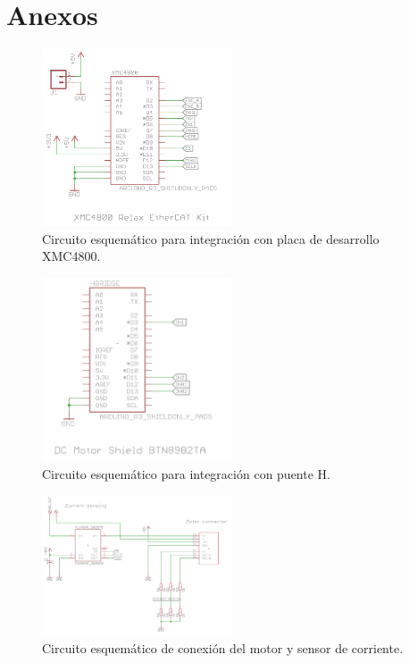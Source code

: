 \chapter{Anexos}

\begin{figure}[ht]
  \centering
  \includegraphics[width=0.5\textwidth]{img/anexo/xmc4800_schematic}
  \caption{Circuito esquemático para integración con placa de desarrollo XMC4800.}
  \label{cap4_scorbot_firmware}
\end{figure}

\begin{figure}[ht]
  \centering
  \includegraphics[width=0.5\textwidth]{img/anexo/puente_h_schematic}
  \caption{Circuito esquemático para integración con puente H.}
  \label{cap4_scorbot_firmware}
\end{figure}


\begin{figure}[ht]
  \centering
  \includegraphics[width=0.5\textwidth]{img/anexo/current_sensor_schematic}
  \caption{Circuito esquemático de conexión del motor y sensor de corriente.}
  \label{cap4_scorbot_firmware}
\end{figure}


